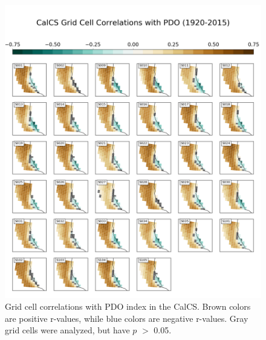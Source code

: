 \documentclass[12pt]{article}
\begin{document}
\begin{figure}[!h]
	\centering
	\includegraphics[width=\linewidth]{../../figs/calcs/spatial-correlations/calcs-grid-cell-correlations-pdo-postage.png}
	\caption{Grid cell correlations with PDO index in the CalCS. Brown colors are positive r-values, while blue colors are negative r-values. Gray grid cells were analyzed, but have $p$ $>$ 0.05.}
	\label{fig:CalCS-PDO-Spatial}
\end{figure}
\newpage
\end{document}
